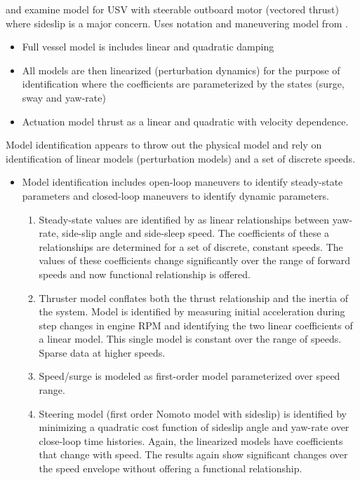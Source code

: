 \documentclass[11pt,draftcls,journal,onecolumn]{../latexlib/latex_ieee/IEEEtran}
\begin{document}
\cite{sonnenburg13modeling} and \cite{sonnenburg10control} examine model for USV with steerable outboard motor (vectored thrust) where sideslip is a major concern.  Uses notation and maneuvering model from \cite{fossen94guidance}.
\begin{itemize}
\item Full vessel model is includes linear and quadratic damping
\item All models are then linearized (perturbation dynamics) for the purpose of identification where the coefficients are parameterized by the states (surge, sway and yaw-rate)
\item Actuation model thrust as a linear  and quadratic with velocity dependence.
\end{itemize}
Model identification appears to throw out the physical model and rely on identification of linear models (perturbation models) and a set of discrete speeds.
\begin{itemize}
\item Model identification includes open-loop maneuvers to identify steady-state parameters and closed-loop maneuvers to identify dynamic parameters.
\begin{enumerate}
\item Steady-state values are identified by as linear relationships between yaw-rate, side-slip angle and side-sleep speed.  The coefficients of these a relationships are determined for a set of discrete, constant speeds.  The values of these coefficients change significantly over the range of forward speeds and now functional relationship is offered.  
\item Thruster model conflates both the thrust relationship and the inertia of the system.  Model is identified by measuring initial acceleration during step changes in engine RPM and identifying the two linear coefficients of a linear model.  This single model is constant over the range of speeds.  Sparse data at higher speeds.
\item Speed/surge is modeled as first-order model parameterized over speed range.
\item Steering model (first order Nomoto model with sideslip) is identified by minimizing a quadratic cost function of sideslip angle and yaw-rate over close-loop time histories. Again, the linearized models have coefficients that change with speed.  The results again show significant changes over the speed envelope without offering a functional relationship.
\end{enumerate}
\end{itemize}
\end{document}
